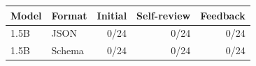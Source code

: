 \begin{tabular}{llrrr}
\toprule
Model & Format & Initial & Self-review & Feedback \\
\midrule
1.5B & JSON & 0/24 & 0/24 & 0/24 \\
1.5B & Schema & 0/24 & 0/24 & 0/24 \\
\bottomrule
\end{tabular}

